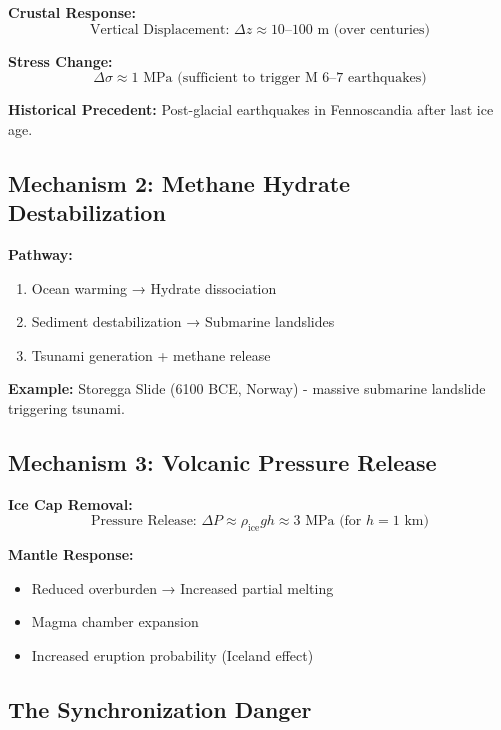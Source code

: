 \documentclass[11pt,a4paper]{article}
\begin{document}
\textbf{Crustal Response:}
\begin{equation}
\text{Vertical Displacement: } \Delta z \approx 10\text{--}100 \text{ m (over centuries)}
\end{equation}

\textbf{Stress Change:}
\begin{equation}
\Delta \sigma \approx 1 \text{ MPa (sufficient to trigger M 6--7 earthquakes)}
\end{equation}

\textbf{Historical Precedent:} Post-glacial earthquakes in Fennoscandia after last ice age.

\subsection{Mechanism 2: Methane Hydrate Destabilization}

\textbf{Pathway:}
\begin{enumerate}
\item Ocean warming → Hydrate dissociation
\item Sediment destabilization → Submarine landslides
\item Tsunami generation + methane release
\end{enumerate}

\textbf{Example:} Storegga Slide (6100 BCE, Norway) - massive submarine landslide triggering tsunami.

\subsection{Mechanism 3: Volcanic Pressure Release}

\textbf{Ice Cap Removal:}
\begin{equation}
\text{Pressure Release: } \Delta P \approx \rho_{\text{ice}} g h \approx 3 \text{ MPa (for } h = 1 \text{ km)}
\end{equation}

\textbf{Mantle Response:}
\begin{itemize}
\item Reduced overburden → Increased partial melting
\item Magma chamber expansion
\item Increased eruption probability (Iceland effect)
\end{itemize}

\subsection{The Synchronization Danger}
\end{document}
